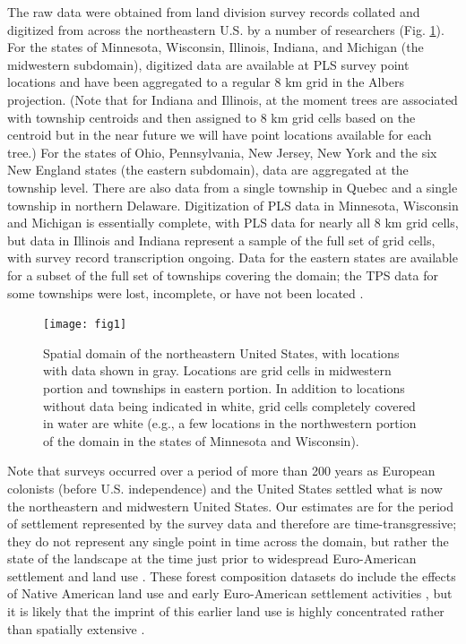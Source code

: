 \documentclass[12pt]{article}
\begin{document}
The raw data were obtained from land division survey records collated
and digitized from across the northeastern U.S. by a number of researchers
(Fig. \ref{fig:Spatial-domain}). For the states of Minnesota, Wisconsin,
Illinois, Indiana, and Michigan (the midwestern subdomain), digitized
data are available at PLS survey point locations and have been aggregated
to a regular 8 km grid in the Albers projection. (Note that for Indiana
and Illinois, at the moment trees are associated with township centroids
and then assigned to 8 km grid cells based on the centroid but in
the near future we will have point locations available for each tree.)
For the states of Ohio, Pennsylvania, New Jersey, New York and the
six New England states (the eastern subdomain), data are aggregated
at the township level. There are also data from a single township
in Quebec and a single township in northern Delaware. Digitization
of PLS data in Minnesota, Wisconsin and Michigan is essentially complete,
with PLS data for nearly all 8 km grid cells, but data in Illinois
and Indiana represent a sample of the full set of grid cells, with
survey record transcription ongoing. Data for the eastern states are
available for a subset of the full set of townships covering the domain;
the TPS data for some townships were lost, incomplete, or have not
been located \citep{Cogb:etal:2002}. 

\begin{figure}
\label{fig:domain}\texttt{[image: fig1]}

\caption{Spatial domain of the northeastern United States, with locations with
data shown in gray. Locations are grid cells in midwestern portion
and townships in eastern portion. In addition to locations without
data being indicated in white, grid cells completely covered in water
are white (e.g., a few locations in the northwestern portion of the
domain in the states of Minnesota and Wisconsin).\label{fig:Spatial-domain}}
\end{figure}


Note that surveys occurred over a period of more than 200 years as
European colonists (before U.S. independence) and the United States
settled what is now the northeastern and midwestern United States.
Our estimates are for the period of settlement represented by the
survey data and therefore are time-transgressive; they do not represent
any single point in time across the domain, but rather the state of
the landscape at the time just prior to widespread Euro-American settlement
and land use \citep{Whit:1996,Cogb:etal:2002}. These forest composition
datasets do include the effects of Native American land use and early
Euro-American settlement activities \citep[e.g.,][]{Blac:etal:2006},
but it is likely that the imprint of this earlier land use is highly
concentrated rather than spatially extensive \citep{munoz2014defining}.
\end{document}
